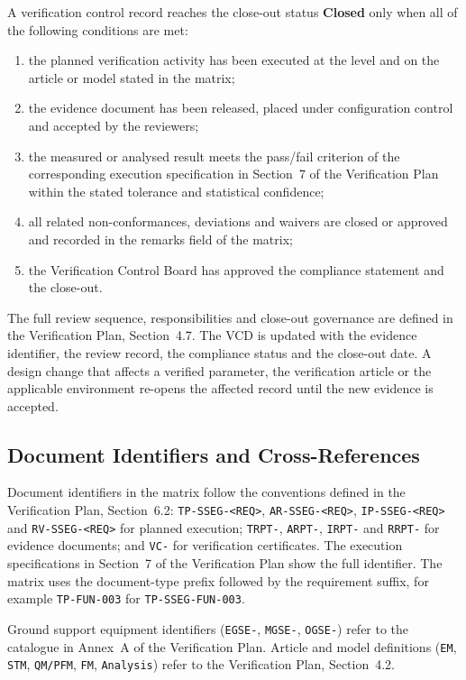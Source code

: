 A verification control record reaches the close-out status \textbf{Closed} only when all of the following conditions are met:
\begin{enumerate}
    \item the planned verification activity has been executed at the level and on the article or model stated in the matrix;
    \item the evidence document has been released, placed under configuration control and accepted by the reviewers;
    \item the measured or analysed result meets the pass/fail criterion of the corresponding execution specification in Section~7 of the Verification Plan within the stated tolerance and statistical confidence;
    \item all related non-conformances, deviations and waivers are closed or approved and recorded in the remarks field of the matrix;
    \item the Verification Control Board has approved the compliance statement and the close-out.
\end{enumerate}

The full review sequence, responsibilities and close-out governance are defined in the Verification Plan, Section~4.7. The VCD is updated with the evidence identifier, the review record, the compliance status and the close-out date. A design change that affects a verified parameter, the verification article or the applicable environment re-opens the affected record until the new evidence is accepted.

\subsection{Document Identifiers and Cross-References}

Document identifiers in the matrix follow the conventions defined in the Verification Plan, Section~6.2: \texttt{TP-SSEG-<REQ>}, \texttt{AR-SSEG-<REQ>}, \texttt{IP-SSEG-<REQ>} and \texttt{RV-SSEG-<REQ>} for planned execution; \texttt{TRPT-}, \texttt{ARPT-}, \texttt{IRPT-} and \texttt{RRPT-} for evidence documents; and \texttt{VC-} for verification certificates. The execution specifications in Section~7 of the Verification Plan show the full identifier. The matrix uses the document-type prefix followed by the requirement suffix, for example \texttt{TP-FUN-003} for \texttt{TP-SSEG-FUN-003}.

Ground support equipment identifiers (\texttt{EGSE-}, \texttt{MGSE-}, \texttt{OGSE-}) refer to the catalogue in Annex~A of the Verification Plan. Article and model definitions (\texttt{EM}, \texttt{STM}, \texttt{QM/PFM}, \texttt{FM}, \texttt{Analysis}) refer to the Verification Plan, Section~4.2.

